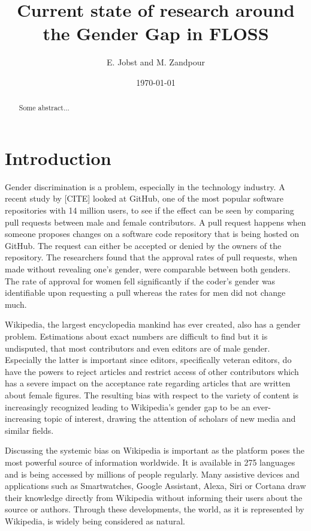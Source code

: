 \documentclass[a4paper, 11pt]{article}
\title{Current state of research around the Gender Gap in FLOSS}
\begin{document}
\date{\today}
\author{E. Jobst and M. Zandpour}
\maketitle

\begin{abstract}
Some abstract...
\end{abstract}

\section{Introduction} \label{sec:intro}
Gender discrimination is a problem, especially in the technology industry. A recent study by [CITE] looked at GitHub, one of the most popular software repositories with 14 million users, to see if the effect can be seen by comparing pull requests between male and female contributors. A pull request happens when someone proposes changes on a software code repository that is being hosted on GitHub. The request can either be accepted or denied by the owners of the repository. The researchers found that the approval rates of pull requests, when made without revealing one’s gender, were comparable between both genders. The rate of approval for women fell significantly if the coder’s gender was identifiable upon requesting a pull whereas the rates for men did not change much.

Wikipedia, the largest encyclopedia mankind has ever created, also has a gender problem. Estimations about exact numbers are difficult to find but it is undisputed, that most contributors and even editors are of male gender. Especially the latter is important since editors, specifically veteran editors, do have the powers to reject articles and restrict access of other contributors which has a severe impact on the acceptance rate regarding articles that are written about female figures. The resulting bias with respect to the variety of content is increasingly recognized leading to Wikipedia’s gender gap to be an ever-increasing topic of interest, drawing the attention of scholars of new media and similar fields.

Discussing the systemic bias on Wikipedia is important as the platform poses the most powerful source of information worldwide. It is available in 275 languages and is being accessed by millions of people regularly. Many assistive devices and applications such as Smartwatches, Google Assistant, Alexa, Siri or Cortana draw their knowledge directly from Wikipedia without informing their users about the source or authors. Through these developments, the world, as it is represented by Wikipedia, is widely being considered as natural.
\end{document}
